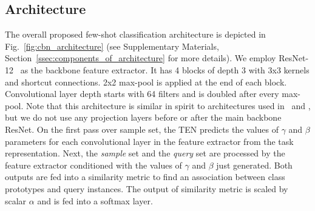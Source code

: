 \documentclass{article}
\begin{document}
\subsection{Architecture} \label{ssec:theory_architecture}

The overall proposed few-shot classification architecture is depicted in Fig.~\ref{fig:cbn_architecture} (see Supplementary Materials, Section~\ref{ssec:components_of_architecture} for more details). We employ ResNet-12~\citep{He2016Deep} as the backbone feature extractor. It has 4 blocks of depth 3 with 3x3 kernels and shortcut connections. 2x2 max-pool is applied at the end of each block. Convolutional layer depth starts with 64 filters and is doubled after every max-pool. Note that this architecture is similar in spirit to architectures used in~\citep{Bauer2017discriminative} and \citep{munkhdalai2018rapid}, but we do not use any projection layers before or after the main backbone ResNet. On the first pass over sample set, the TEN predicts the values of $\gamma$ and $\beta$ parameters for each convolutional layer in the feature extractor from the task representation. Next, the \emph{sample} set and the \emph{query} set are processed by the feature extractor conditioned with the values of $\gamma$ and $\beta$ just generated. Both outputs are fed into a similarity metric to find an association between class prototypes and query instances. The output of similarity metric is scaled by scalar $\alpha$ and is fed into a softmax layer.
\end{document}
